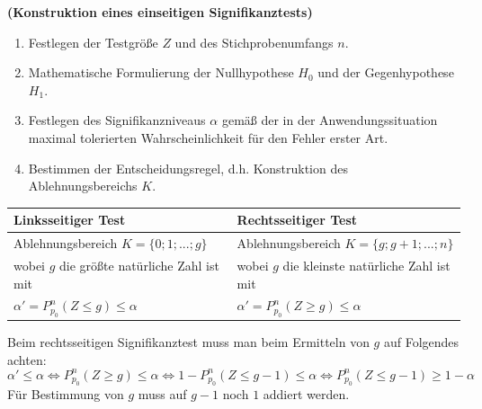 \documentclass[ngerman, 12pt]{nssheetxea}
\begin{document}
\begin{theorem} \textbf{(Konstruktion eines einseitigen Signifikanztests)} \par
\begin{enumerate}
\item Festlegen der Testgröße $Z$ und des Stichprobenumfangs $n$.
\item Mathematische Formulierung der Nullhypothese $H_0$ und der Gegenhypothese $H_1$.
\item Festlegen des Signifikanzniveaus $\alpha$ gemäß der in der Anwendungssituation maximal tolerierten Wahrscheinlichkeit für den Fehler erster Art.
\item Bestimmen der Entscheidungsregel, d.h. Konstruktion des Ablehnungsbereichs $K$.
\end{enumerate}
\newpage
\begin{tabularx}{\textwidth}{ X X  }
\textbf{Linksseitiger Test} & \textbf{Rechtsseitiger Test} \\
\midrule
Ablehnungsbereich $K=\{ 0; 1; ...; g \}$ & Ablehnungsbereich $K=\{ g; g+1; ...; n \}$ \\
wobei $g$ die größte natürliche Zahl ist mit & wobei  $g$ die kleinste natürliche Zahl ist mit \\
$\alpha'=P_{p_0}^n(Z\leq g)\leq \alpha$ & $\alpha'=P_{p_0}^n(Z\geq g)\leq \alpha$ \\
\end{tabularx}
\end{theorem}

Beim rechtsseitigen Signifikanztest muss man beim Ermitteln von $g$ auf Folgendes achten: 
\[ \alpha' \leq \alpha \Leftrightarrow P_{p_0}^n(Z\geq g) \leq \alpha \Leftrightarrow 1-P_{p_0}^n(Z\leq g - 1) \leq \alpha \Leftrightarrow P_{p_0}^n (Z\leq g - 1) \geq 1 - \alpha  \]
Für Bestimmung von $g$ muss auf $g-1$ noch $1$ addiert werden. 
\end{document}
